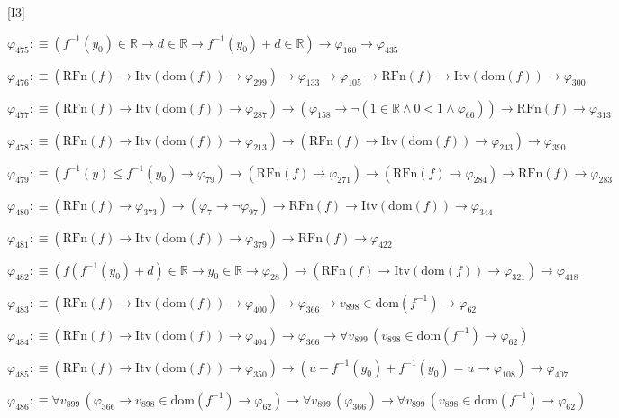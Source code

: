 \begin{fullproof}{[I3]}
\begin{abbrevlist}
\item $\varphi_{475} :\equiv (f^{-1}(y_{0}) \in \mathbb{R} \to d \in \mathbb{R} \to f^{-1}(y_{0}) + d \in \mathbb{R}) \to \varphi_{160} \to \varphi_{435}$
\item $\varphi_{476} :\equiv (\mathrm{RFn}(f) \to \mathrm{Itv}(\mathrm{dom}(f)) \to \varphi_{299}) \to \varphi_{133} \to \varphi_{105} \to \mathrm{RFn}(f) \to \mathrm{Itv}(\mathrm{dom}(f)) \to \varphi_{300}$
\item $\varphi_{477} :\equiv (\mathrm{RFn}(f) \to \mathrm{Itv}(\mathrm{dom}(f)) \to \varphi_{287}) \to (\varphi_{158} \to \neg (1 \in \mathbb{R} \land 0 < 1 \land \varphi_{66})) \to \mathrm{RFn}(f) \to \varphi_{313}$
\item $\varphi_{478} :\equiv (\mathrm{RFn}(f) \to \mathrm{Itv}(\mathrm{dom}(f)) \to \varphi_{213}) \to (\mathrm{RFn}(f) \to \mathrm{Itv}(\mathrm{dom}(f)) \to \varphi_{243}) \to \varphi_{390}$
\item $\varphi_{479} :\equiv (f^{-1}(y) \leq f^{-1}(y_{0}) \to \varphi_{79}) \to (\mathrm{RFn}(f) \to \varphi_{271}) \to (\mathrm{RFn}(f) \to \varphi_{284}) \to \mathrm{RFn}(f) \to \varphi_{283}$
\item $\varphi_{480} :\equiv (\mathrm{RFn}(f) \to \varphi_{373}) \to (\varphi_{7} \to \neg \varphi_{97}) \to \mathrm{RFn}(f) \to \mathrm{Itv}(\mathrm{dom}(f)) \to \varphi_{344}$
\item $\varphi_{481} :\equiv (\mathrm{RFn}(f) \to \mathrm{Itv}(\mathrm{dom}(f)) \to \varphi_{379}) \to \mathrm{RFn}(f) \to \varphi_{422}$
\item $\varphi_{482} :\equiv (f(f^{-1}(y_{0}) + d) \in \mathbb{R} \to y_{0} \in \mathbb{R} \to \varphi_{28}) \to (\mathrm{RFn}(f) \to \mathrm{Itv}(\mathrm{dom}(f)) \to \varphi_{321}) \to \varphi_{418}$
\item $\varphi_{483} :\equiv (\mathrm{RFn}(f) \to \mathrm{Itv}(\mathrm{dom}(f)) \to \varphi_{400}) \to \varphi_{366} \to v_{898} \in \mathrm{dom}(f^{-1}) \to \varphi_{62}$
\item $\varphi_{484} :\equiv (\mathrm{RFn}(f) \to \mathrm{Itv}(\mathrm{dom}(f)) \to \varphi_{404}) \to \varphi_{366} \to \forall v_{899}\,(v_{898} \in \mathrm{dom}(f^{-1}) \to \varphi_{62})$
\item $\varphi_{485} :\equiv (\mathrm{RFn}(f) \to \mathrm{Itv}(\mathrm{dom}(f)) \to \varphi_{350}) \to (u - f^{-1}(y_{0}) + f^{-1}(y_{0}) = u \to \varphi_{108}) \to \varphi_{407}$
\item $\varphi_{486} :\equiv \forall v_{899}\,(\varphi_{366} \to v_{898} \in \mathrm{dom}(f^{-1}) \to \varphi_{62}) \to \forall v_{899}\,(\varphi_{366}) \to \forall v_{899}\,(v_{898} \in \mathrm{dom}(f^{-1}) \to \varphi_{62})$

\end{abbrevlist}
\end{fullproof}
